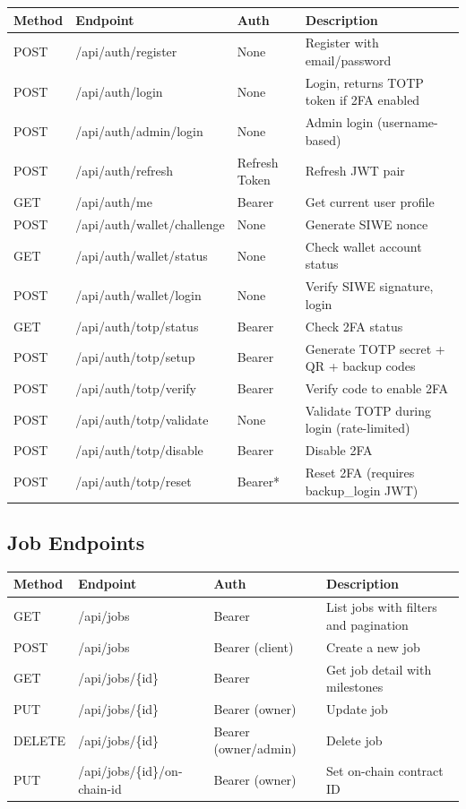 \documentclass[12pt,a4paper]{article}
\begin{document}
\begin{longtable}{lllX}
\toprule
\textbf{Method} & \textbf{Endpoint} & \textbf{Auth} & \textbf{Description} \\
\midrule
\endhead
POST & /api/auth/register & None & Register with email/password \\
POST & /api/auth/login & None & Login, returns TOTP token if 2FA enabled \\
POST & /api/auth/admin/login & None & Admin login (username-based) \\
POST & /api/auth/refresh & Refresh Token & Refresh JWT pair \\
GET & /api/auth/me & Bearer & Get current user profile \\
POST & /api/auth/wallet/challenge & None & Generate SIWE nonce \\
GET & /api/auth/wallet/status & None & Check wallet account status \\
POST & /api/auth/wallet/login & None & Verify SIWE signature, login \\
GET & /api/auth/totp/status & Bearer & Check 2FA status \\
POST & /api/auth/totp/setup & Bearer & Generate TOTP secret + QR + backup codes \\
POST & /api/auth/totp/verify & Bearer & Verify code to enable 2FA \\
POST & /api/auth/totp/validate & None & Validate TOTP during login (rate-limited) \\
POST & /api/auth/totp/disable & Bearer & Disable 2FA \\
POST & /api/auth/totp/reset & Bearer* & Reset 2FA (requires backup\_login JWT) \\
\bottomrule
\end{longtable}

\subsection{Job Endpoints}

\begin{longtable}{lllX}
\toprule
\textbf{Method} & \textbf{Endpoint} & \textbf{Auth} & \textbf{Description} \\
\midrule
\endhead
GET & /api/jobs & Bearer & List jobs with filters and pagination \\
POST & /api/jobs & Bearer (client) & Create a new job \\
GET & /api/jobs/\{id\} & Bearer & Get job detail with milestones \\
PUT & /api/jobs/\{id\} & Bearer (owner) & Update job \\
DELETE & /api/jobs/\{id\} & Bearer (owner/admin) & Delete job \\
PUT & /api/jobs/\{id\}/on-chain-id & Bearer (owner) & Set on-chain contract ID \\
\bottomrule
\end{longtable}
\end{document}
